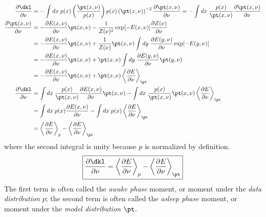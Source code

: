 \documentclass[11pt]{article}
\begin{document}
\begin{equation}
\begin{split}
\frac{\partial \dkl}{\partial \nu} 
&=
- \int dx \; p(x) \left ( \frac{\pt(x,\nu)}{p(x)} \right ) p(x) \left ( \pt(x,\nu) \right )^{-2} \frac{\partial \pt(x,\nu)}{\partial \nu}
=
- \int dx \; \frac{p(x)}{\pt(x,\nu)} \frac{\partial \pt(x,\nu)}{\partial \nu} \\
\frac{\partial \pt(x,\nu)}{\partial \nu}
&=
- \frac{\partial E(x,\nu)}{\partial \nu} \pt(x, \nu) - \frac{1}{Z(\nu)^2} \exp[-E(x,\nu)] \frac{\partial Z(\nu)}{\partial \nu} \\
&=
- \frac{\partial E(x,\nu)}{\partial \nu} \pt(x, \nu) + \frac{1}{Z(\nu)} \pt(x,\nu) \int dy \; \frac{\partial E(y,\nu)}{\partial \nu} \exp[-E(y,\nu)] \\
&=
- \frac{\partial E(x,\nu)}{\partial \nu} \pt(x, \nu) + \pt(x,\nu) \int dy \; \frac{\partial E(y,\nu)}{\partial \nu} \pt(y,\nu) \\
&=
- \frac{\partial E(x,\nu)}{\partial \nu} \pt(x, \nu) + \pt(x,\nu) \left \langle \frac{\partial E}{\partial \nu} \right \rangle_{\pt} \\
\frac{\partial \dkl}{\partial \nu} 
&=
\int dx \; \frac{p(x)}{\pt(x,\nu)} \frac{\partial E(x,\nu)}{\partial \nu} \pt(x, \nu)
- \int dx \; \frac{p(x)}{\pt(x,\nu)} \pt(x,\nu) \left \langle \frac{\partial E}{\partial \nu} \right \rangle_{\pt} \\
&=
\int dx \; p(x) \frac{\partial E(x,\nu)}{\partial \nu}
- \int dx \; p(x) \left \langle \frac{\partial E}{\partial \nu} \right \rangle_{\pt} \\
&=
\left \langle \frac{\partial E}{\partial \nu} \right \rangle_p
- \left \langle \frac{\partial E}{\partial \nu} \right \rangle_{\pt}
\end{split}
\end{equation}
where the second integral is unity because $p$ is normalized by definition.
\begin{equation}
\boxed{
\frac{\partial \dkl}{\partial \nu} 
=
\left \langle \frac{\partial E}{\partial \nu} \right \rangle_p
- \left \langle \frac{\partial E}{\partial \nu} \right \rangle_{\pt}
}
\end{equation}
The first term is often called the \textit{awake phase} moment, or moment under the \textit{data distribution} $p$; the second term is often called the \textit{asleep phase} moment, or moment under the \textit{model distribution} $\pt$.
\end{document}
